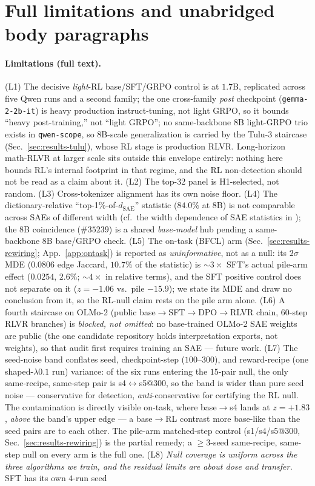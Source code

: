 \documentclass{article}
\begin{document}
\section{Full limitations and unabridged body paragraphs}
\label{app:limits}
\paragraph{Limitations (full text).} (L1) The decisive \emph{light}-RL base/SFT/GRPO control is at $1.7$B, replicated across five Qwen runs and a second family; the one cross-family \emph{post} checkpoint (\texttt{gemma-2-2b-it}) is heavy production instruct-tuning, not light GRPO, so it bounds ``heavy post-training,'' not ``light GRPO''; no same-backbone 8B light-GRPO trio exists in \texttt{qwen-scope}, so 8B-scale generalization is carried by the Tulu-3 staircase (Sec.~\ref{sec:results-tulu}), whose RL stage is production RLVR. Long-horizon math-RLVR at larger scale sits outside this envelope entirely: nothing here bounds RL's internal footprint in that regime, and the RL non-detection should not be read as a claim about it. (L2) The top-32 panel is H1-selected, not random. (L3) Cross-tokenizer alignment has its own noise floor. (L4) The dictionary-relative ``top-1\%-of-$d_{\text{SAE}}$'' statistic ($84.0\%$ at 8B) is not comparable across SAEs of different width (cf.\ the width dependence of SAE statistics in \citealp{geometric_wall2026}); the 8B coincidence ($\#35239$) is a shared \emph{base-model} hub pending a same-backbone 8B base/GRPO check. (L5) The on-task (BFCL) arm (Sec.~\ref{sec:results-rewiring}; App.~\ref{app:ontask}) is reported as \emph{uninformative}, not as a null: its $2\sigma$ MDE ($0.0806$ edge Jaccard, $10.7\%$ of the statistic) is ${\sim}3\times$ SFT's actual pile-arm effect ($0.0254$, $2.6\%$; ${\sim}4\times$ in relative terms), and the SFT positive control does not separate on it ($z=-1.06$ vs.\ pile $-15.9$); we state its MDE and draw no conclusion from it, so the RL-null claim rests on the pile arm alone. (L6) A fourth staircase on OLMo-2 (public base$\to$SFT$\to$DPO$\to$RLVR chain, $60$-step RLVR branches) is \emph{blocked, not omitted}: no base-trained OLMo-2 SAE weights are public (the one candidate repository holds interpretation exports, not weights), so that audit first requires training an SAE --- future work. (L7) The seed-noise band conflates seed, checkpoint-step ($100$--$300$), and reward-recipe (one shaped-$\lambda0.1$ run) variance: of the six runs entering the $15$-pair null, the only same-recipe, same-step pair is s4$\leftrightarrow$s5@$300$, so the band is wider than pure seed noise --- conservative for detection, \emph{anti}-conservative for certifying the RL null. The contamination is directly visible on-task, where base$\to$s4 lands at $z=+1.83$, \emph{above} the band's upper edge --- a base$\to$RL contrast more base-like than the seed pairs are to each other. The pile-arm matched-step control (s1/s4/s5@$300$, Sec.~\ref{sec:results-rewiring}) is the partial remedy; a $\ge3$-seed same-recipe, same-step null on every arm is the full one. (L8) \emph{Null coverage is uniform across the three algorithms we train, and the residual limits are about dose and transfer.} SFT has its own $4$-run seed 
\end{document}
